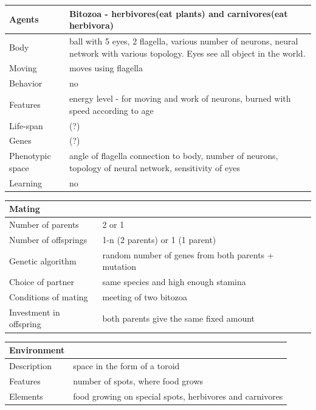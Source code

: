 \documentclass[a4paper,12pt]{report}
\begin{document}
\vspace{20pt}
\begin{tabular}{|p{150pt}|p{220pt}|}
\hline
\textbf{Agents}&Bitozoa - herbivores(eat plants) and carnivores(eat herbivora)\\ \hline
Body&ball with 5 eyes, 2 flagella, various number of neurons, neural network with various topology. Eyes see all object in the world.\\ \hline
Moving&moves using flagella\\ \hline
Behavior&no\\ \hline
Features&energy level - for moving and work of neurons, burned with speed according to age \\ \hline
Life-span&(?)\\ \hline
Genes&(?)\\ \hline
Phenotypic space&angle of flagella connection to body, number of neurons, topology of neural network, sensitivity of eyes\\ \hline
Learning&no\\ \hline
\end{tabular} 

\vspace{10pt}
\begin{tabular}{|p{150pt}|p{220pt}|}
\hline 	\textbf  {Mating}&\\ \hline
Number of parents&2 or 1\\ \hline
Number of offsprings&1-n (2 parents) or 1 (1 parent)\\ \hline
Genetic algorithm&random number of genes from both parents + mutation\\ \hline
Choice of partner&same species and high enough stamina\\ \hline
Conditions of mating&meeting of two bitozoa \\ \hline
Investment in offspring&both parents give the same fixed amount\\ \hline
\end{tabular} 

\vspace{10pt}
\begin{tabular}{|p{150pt}|p{220pt}|}
\hline 	\textbf  {Environment}&\\ \hline
Description&space in the form of a toroid\\ \hline
Features&number of spots, where food grows\\ \hline
Elements&food growing on special spots, herbivores and carnivores\\ \hline
\end{tabular}
 
\end{document}

